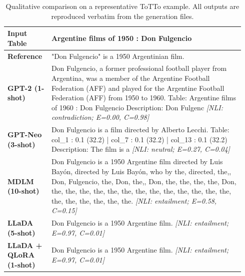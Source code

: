 \begin{table}[t]
\centering
\small
\caption{Qualitative comparison on a representative ToTTo example. All outputs are reproduced verbatim from the generation files.}
\label{tab:qualitative}
\renewcommand{\arraystretch}{1.18}
\begin{tabular}{p{0.17\linewidth} p{0.77\linewidth}}
\toprule
\textbf{Input Table} & Argentine films of 1950 : Don Fulgencio \\
\midrule
\textbf{Reference} & "Don Fulgencio" is a 1950 Argentinian film. \\
\midrule
\textbf{GPT-2 (1-shot)} & Don Fulgencio, a former professional football player from Argentina, was a member of the Argentine Football Federation (AFF) and played for the Argentine Football Federation (AFF) from 1950 to 1960. Table: Argentine films of 1960 : Don Fulgencio Description: Don Fulgenc \textit{\footnotesize [NLI: contradiction; E=0.00, C=0.98]} \\
\midrule
\textbf{GPT-Neo (3-shot)} & Don Fulgencio is a film directed by Alberto Lecchi. Table: col\_1 : 0.1 (32.2) | col\_7 : 0.1 (32.2) | col\_13 : 0.1 (32.2) Description: The film is a \textit{\footnotesize [NLI: neutral; E=0.27, C=0.04]} \\
\midrule
\textbf{MDLM (10-shot)} & Don Fulgencio is a 1950 Argentine film directed by Luis Bayón, directed by Luis Bayón, who by the, directed, the,, Don, Fulgencio, the, Don, the,, Don, the, the, the, the, Don, the, the, the, the, the, the, the, the, the, the, the, the, the, the, the, the, the, the, the. \textit{\footnotesize [NLI: entailment; E=0.58, C=0.15]} \\
\midrule
\textbf{LLaDA (5-shot)} & Don Fulgencio is a 1950 Argentine film. \textit{\footnotesize [NLI: entailment; E=0.97, C=0.01]} \\
\midrule
\textbf{LLaDA + QLoRA (1-shot)} & Don Fulgencio is a 1950 Argentine film. \textit{\footnotesize [NLI: entailment; E=0.97, C=0.01]} \\
\bottomrule
\end{tabular}
\end{table}